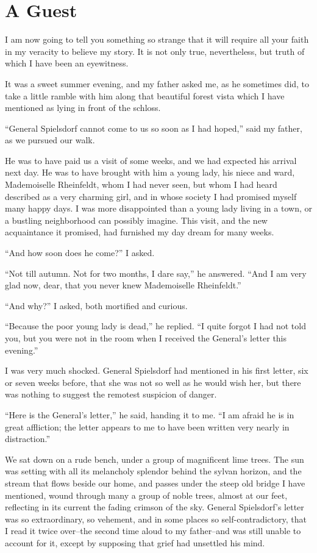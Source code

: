 \documentclass[11pt,twoside,makeidx,hidelinks,]{memoir}
\begin{document}
\pbreak{}

\chapter{A Guest}\hypertarget{a-guest}{}\label{a-guest}

I am now going to tell you something so strange that it will require all
your faith in my veracity to believe my story. It is not only true,
nevertheless, but truth of which I have been an eyewitness.

It was a sweet summer evening, and my father asked me, as he sometimes
did, to take a little ramble with him along that beautiful forest vista
which I have mentioned as lying in front of the schloss.

``General Spielsdorf cannot come to us so soon as I had hoped,'' said my
father, as we pursued our walk.

He was to have paid us a visit of some weeks, and we had expected his
arrival next day. He was to have brought with him a young lady, his
niece and ward, Mademoiselle Rheinfeldt, whom I had never seen, but whom
I had heard described as a very charming girl, and in whose society I
had promised myself many happy days. I was more disappointed than a
young lady living in a town, or a bustling neighborhood can possibly
imagine. This visit, and the new acquaintance it promised, had furnished
my day dream for many weeks.

``And how soon does he come?'' I asked.

``Not till autumn. Not for two months, I dare say,'' he answered. ``And I
am very glad now, dear, that you never knew Mademoiselle Rheinfeldt.''

``And why?'' I asked, both mortified and curious.

``Because the poor young lady is dead,'' he replied. ``I quite forgot I had
not told you, but you were not in the room when I received the General's
letter this evening.''

I was very much shocked. General Spielsdorf had mentioned in his first
letter, six or seven weeks before, that she was not so well as he would
wish her, but there was nothing to suggest the remotest suspicion
of danger.

``Here is the General's letter,'' he said, handing it to me. ``I am afraid
he is in great affliction; the letter appears to me to have been written
very nearly in distraction.''

We sat down on a rude bench, under a group of magnificent lime trees.
The sun was setting with all its melancholy splendor behind the sylvan
horizon, and the stream that flows beside our home, and passes under the
steep old bridge I have mentioned, wound through many a group of noble
trees, almost at our feet, reflecting in its current the fading crimson
of the sky. General Spielsdorf's letter was so extraordinary, so
vehement, and in some places so self-contradictory, that I read it twice
over--the second time aloud to my father--and was still unable to
account for it, except by supposing that grief had unsettled his mind.
\end{document}
